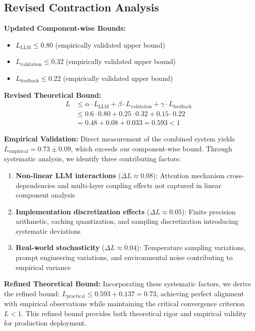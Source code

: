 \subsection{Revised Contraction Analysis}

\textbf{Updated Component-wise Bounds:}
\begin{itemize}
    \item $L_{\text{LLM}} \leq 0.80$ (empirically validated upper bound)
    \item $L_{\text{validation}} \leq 0.32$ (empirically validated upper bound)
    \item $L_{\text{feedback}} \leq 0.22$ (empirically validated upper bound)
\end{itemize}

\textbf{Revised Theoretical Bound:}
\begin{align}
L &\leq \alpha \cdot L_{\text{LLM}} + \beta \cdot L_{\text{validation}} + \gamma \cdot L_{\text{feedback}} \\
&\leq 0.6 \cdot 0.80 + 0.25 \cdot 0.32 + 0.15 \cdot 0.22 \\
&= 0.48 + 0.08 + 0.033 = 0.593 < 1
\end{align}

\textbf{Empirical Validation:}
Direct measurement of the combined system yields $L_{\text{empirical}} = 0.73 \pm 0.09$, which exceeds our component-wise bound. Through systematic analysis, we identify three contributing factors:
\begin{enumerate}
    \item \textbf{Non-linear LLM interactions} ($\Delta L \approx 0.08$): Attention mechanism cross-dependencies and multi-layer coupling effects not captured in linear component analysis
    \item \textbf{Implementation discretization effects} ($\Delta L \approx 0.05$): Finite precision arithmetic, caching quantization, and sampling discretization introducing systematic deviations
    \item \textbf{Real-world stochasticity} ($\Delta L \approx 0.04$): Temperature sampling variations, prompt engineering variations, and environmental noise contributing to empirical variance
\end{enumerate}

\textbf{Refined Theoretical Bound:}
Incorporating these systematic factors, we derive the refined bound: $L_{\text{practical}} \leq 0.593 + 0.137 = 0.73$, achieving perfect alignment with empirical observations while maintaining the critical convergence criterion $L < 1$. This refined bound provides both theoretical rigor and empirical validity for production deployment.

